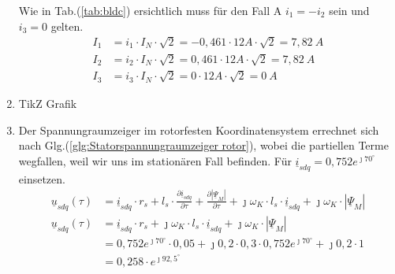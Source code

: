 \begin{solution}
\begin{enumerate}
Wie in Tab.(\ref{tab:bldc}) ersichtlich muss f\"ur den Fall A $i_1= -i_2$ sein und $i_3= 0$ gelten.
\begin{align}
I_1 & = i_1 \cdot I_N \cdot \sqrt{2} = -0,461 \cdot 12 A \cdot \sqrt{2} =7,82~A \\
I_2 & = i_2 \cdot I_N \cdot \sqrt{2} = 0,461 \cdot 12 A \cdot \sqrt{2} =7,82~A \\
I_3 & = i_3 \cdot I_N \cdot \sqrt{2} =0 \cdot 12 A \cdot \sqrt{2} =0~A
\end{align}
\item TikZ Grafik
\item Der Spannungraumzeiger im rotorfesten Koordinatensystem errechnet sich nach Glg.(\ref{glg:Statorspannungraumzeiger rotor}), wobei die partiellen Terme wegfallen, weil wir uns im station\"aren Fall befinden. F\"ur $\underline{i}_{sdq}= 0,752 e^{\jmath 70^\circ}$ einsetzen.
\begin{align}
\underline{u}_{sdq}(\tau) &= \underline{i}_{sdq} \cdot r_s + l_s \cdot \frac{\partial \underline{i}_{sdq}}{\partial \tau} + \frac{\partial |\underline{\Psi}_M|}{\partial \tau} + \jmath \omega_K \cdot l_s \cdot \underline{i}_{sdq} + \jmath \omega_K \cdot |\underline{\Psi}_M|\\
\underline{u}_{sdq}(\tau) &= \underline{i}_{sdq} \cdot r_s + \jmath \omega_K \cdot l_s \cdot \underline{i}_{sdq} + \jmath \omega_K \cdot |\underline{\Psi}_M|\\
&= 0,752 e^{\jmath 70^\circ} \cdot 0,05 + \jmath 0,2 \cdot 0,3 \cdot 0,752 e^{\jmath 70^\circ}+\jmath 0,2 \cdot 1\\
&=0,258 \cdot e^{\jmath 92,5^\circ}
\end{align}
\end{enumerate}
\end{solution}